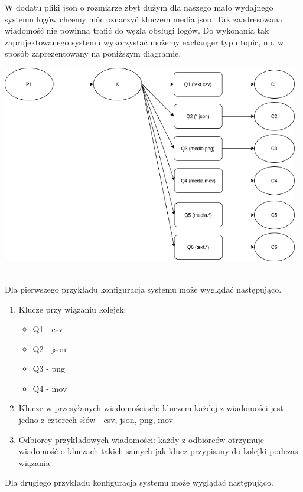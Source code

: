 \documentclass{article}
\begin{document}
        W dodatu pliki json o rozmiarze zbyt dużym dla naszego mało wydajnego systemu logów chcemy móc oznaczyć kluczem media.json. Tak zaadresowana wiadomość nie powinna trafić do węzła obsługi logów.
        Do wykonania tak zaprojektowanego systemu wykorzystać możemy exchanger typu topic, np. w sposób zaprezentowany na poniższym diagramie. 
        \begin{center}
            \includegraphics[width=13cm]{lab2/report/ex3_2.png}
        \end{center}\\
        Dla pierwszego przykładu konfiguracja systemu może wyglądać następująco. 
        \begin{enumerate}
            \item Klucze przy wiązaniu kolejek: \begin{itemize}
                \item Q1 - csv
                \item Q2 - json
                \item Q3 - png
                \item Q4 - mov
                \end{itemize}
            \item Klucze w przesyłanych wiadomościach: kluczem każdej z wiadomości jest jedno z czterech słów - csv, json, png, mov
            \item Odbiorcy przykładowych wiadomości: każdy z odbiorców otrzymuje wiadomość o kluczach takich samych jak klucz przypisany do kolejki podczas wiązania
        \end{enumerate}
        Dla drugiego przykładu konfiguracja systemu może wyglądać następująco. 
\end{document}
